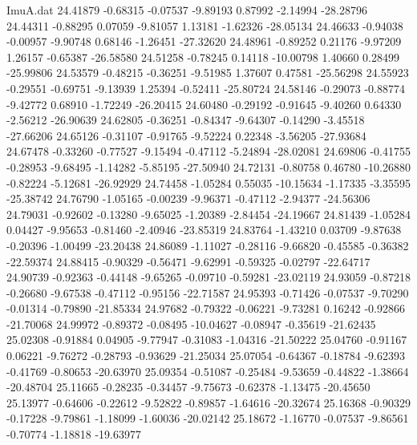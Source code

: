 \begin{filecontents}{ImuA.dat}
  24.41879   -0.68315   -0.07537   -9.89193    0.87992   -2.14994  -28.28796
  24.44311   -0.88295    0.07059   -9.81057    1.13181   -1.62326  -28.05134
  24.46633   -0.94038   -0.00957   -9.90748    0.68146   -1.26451  -27.32620
  24.48961   -0.89252    0.21176   -9.97209    1.26157   -0.65387  -26.58580
  24.51258   -0.78245    0.14118  -10.00798    1.40660    0.28499  -25.99806
  24.53579   -0.48215   -0.36251   -9.51985    1.37607    0.47581  -25.56298
  24.55923   -0.29551   -0.69751   -9.13939    1.25394   -0.52411  -25.80724
  24.58146   -0.29073   -0.88774   -9.42772    0.68910   -1.72249  -26.20415
  24.60480   -0.29192   -0.91645   -9.40260    0.64330   -2.56212  -26.90639
  24.62805   -0.36251   -0.84347   -9.64307   -0.14290   -3.45518  -27.66206
  24.65126   -0.31107   -0.91765   -9.52224    0.22348   -3.56205  -27.93684
  24.67478   -0.33260   -0.77527   -9.15494   -0.47112   -5.24894  -28.02081
  24.69806   -0.41755   -0.28953   -9.68495   -1.14282   -5.85195  -27.50940
  24.72131   -0.80758    0.46780  -10.26880   -0.82224   -5.12681  -26.92929
  24.74458   -1.05284    0.55035  -10.15634   -1.17335   -3.35595  -25.38742
  24.76790   -1.05165   -0.00239   -9.96371   -0.47112   -2.94377  -24.56306
  24.79031   -0.92602   -0.13280   -9.65025   -1.20389   -2.84454  -24.19667
  24.81439   -1.05284    0.04427   -9.95653   -0.81460   -2.40946  -23.85319
  24.83764   -1.43210    0.03709   -9.87638   -0.20396   -1.00499  -23.20438
  24.86089   -1.11027   -0.28116   -9.66820   -0.45585   -0.36382  -22.59374
  24.88415   -0.90329   -0.56471   -9.62991   -0.59325   -0.02797  -22.64717
  24.90739   -0.92363   -0.44148   -9.65265   -0.09710   -0.59281  -23.02119
  24.93059   -0.87218   -0.26680   -9.67538   -0.47112   -0.95156  -22.71587
  24.95393   -0.71426   -0.07537   -9.70290   -0.01314   -0.79890  -21.85334
  24.97682   -0.79322   -0.06221   -9.73281    0.16242   -0.92866  -21.70068
  24.99972   -0.89372   -0.08495  -10.04627   -0.08947   -0.35619  -21.62435
  25.02308   -0.91884    0.04905   -9.77947   -0.31083   -1.04316  -21.50222
  25.04760   -0.91167    0.06221   -9.76272   -0.28793   -0.93629  -21.25034
  25.07054   -0.64367   -0.18784   -9.62393   -0.41769   -0.80653  -20.63970
  25.09354   -0.51087   -0.25484   -9.53659   -0.44822   -1.38664  -20.48704
  25.11665   -0.28235   -0.34457   -9.75673   -0.62378   -1.13475  -20.45650
  25.13977   -0.64606   -0.22612   -9.52822   -0.89857   -1.64616  -20.32674
  25.16368   -0.90329   -0.17228   -9.79861   -1.18099   -1.60036  -20.02142
  25.18672   -1.16770   -0.07537   -9.86561   -0.70774   -1.18818  -19.63977

\end{filecontents}
